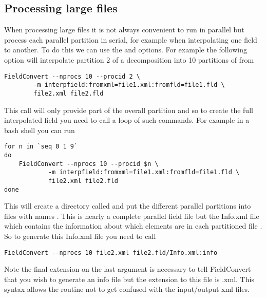 \subsection{Processing large files}
When processing large files it is not always convenient to run in parallel but 
process each parallel partition in serial, for example when interpolating one 
field to another. To do this we can use the  and 
 options. For example the following option will interpolate 
partition 2 of a decomposition into 10 partitions of  from 
\begin{lstlisting}[style=BashInputStyle] 
FieldConvert --nprocs 10 --procid 2 \
        -m interpfield:fromxml=file1.xml:fromfld=file1.fld \
        file2.xml file2.fld
\end{lstlisting}
This call will only provide part of the overall partition and so to create the 
full interpolated field you need to call a loop of such commands. For example in 
a bash shell you can run
\begin{lstlisting}[style=BashInputStyle] 
for n in `seq 0 1 9`
do 
    FieldConvert --nprocs 10 --procid $n \ 
            -m interpfield:fromxml=file1.xml:fromfld=file1.fld \
            file2.xml file2.fld
done
\end{lstlisting}

This will create a directory called  and put the different 
parallel partitions into files with names 
. This is nearly a complete
parallel field file but the Info.xml file which contains the information about 
which elements are in each partitioned file \inltt{P000000X.fld}. So to generate
this Info.xml file you need to call
\begin{lstlisting}[style=BashInputStyle] 
FieldConvert --nprocs 10 file2.xml file2.fld/Info.xml:info
\end{lstlisting}
Note the final \inltt{:info} extension on the last argument is necessary to tell
FieldConvert that you wish to generate an info file but the extension to this
file is .xml. This syntax allows the routine not to get confused with the
input/output xml files.

